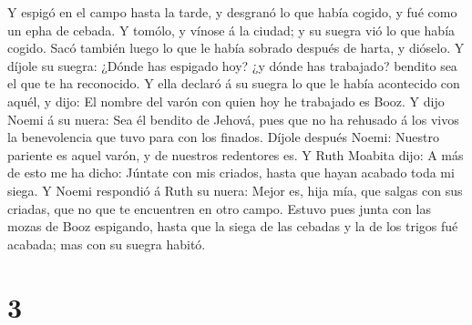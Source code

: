  Y espigó en el campo hasta la tarde, y desgranó lo que
había cogido, y fué como un epha de cebada.  Y tomólo, y
vínose á la ciudad; y su suegra vió lo que había cogido. Sacó también
luego lo que le había sobrado después de harta, y dióselo.
 Y díjole su suegra: ¿Dónde has espigado hoy? ¿y dónde
has trabajado? bendito sea el que te ha reconocido. Y ella declaró á su
suegra lo que le había acontecido con aquél, y dijo: El nombre del varón
con quien hoy he trabajado es Booz.  Y dijo Noemi á su
nuera: Sea él bendito de Jehová, pues que no ha rehusado á los vivos la
benevolencia que tuvo para con los finados. Díjole después Noemi:
Nuestro pariente es aquel varón, y de nuestros redentores es.
 Y Ruth Moabita dijo: A más de esto me ha dicho: Júntate
con mis criados, hasta que hayan acabado toda mi siega. 
Y Noemi respondió á Ruth su nuera: Mejor es, hija mía, que salgas con
sus criadas, que no que te encuentren en otro campo. 
Estuvo pues junta con las mozas de Booz espigando, hasta que la siega de
las cebadas y la de los trigos fué acabada; mas con su suegra habitó.

\hypertarget{section-2}{%
\section{3}\label{section-2}}

